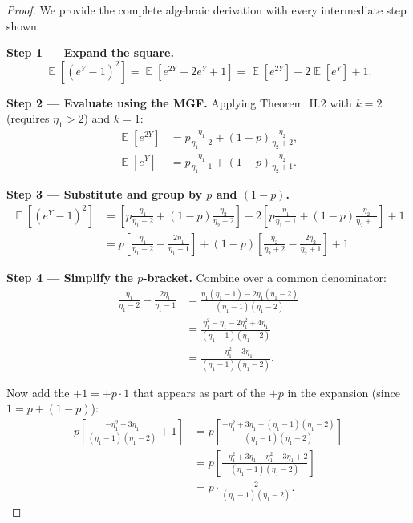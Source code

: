 \documentclass[11pt,a4paper,openany]{book}
\theoremstyle{definition}
\theoremstyle{plain}
\theoremstyle{remark}
\DeclareMathOperator{\E}{\mathbb{E}}
\newcommand{\1}{\mathbbm{1}}
\begin{document}
\begin{proof}
We provide the complete algebraic derivation with every intermediate step shown.

\textbf{Step 1 --- Expand the square.}
\[
\E[(e^{Y} - 1)^{2}] = \E[e^{2Y} - 2e^{Y} + 1] = \E[e^{2Y}] - 2\E[e^{Y}] + 1.
\]

\textbf{Step 2 --- Evaluate using the MGF.} Applying Theorem~H.2 with $k=2$ (requires $\eta_{1} > 2$) and $k=1$:
\[
\begin{aligned}
\E[e^{2Y}] &= p \frac{\eta_{1}}{\eta_{1} - 2} + (1-p) \frac{\eta_{2}}{\eta_{2} + 2}, \\
\E[e^{Y}] &= p \frac{\eta_{1}}{\eta_{1} - 1} + (1-p) \frac{\eta_{2}}{\eta_{2} + 1}.
\end{aligned}
\]

\textbf{Step 3 --- Substitute and group by $p$ and $(1-p)$.}
\[
\begin{aligned}
\E[(e^{Y} - 1)^{2}] &= \left[p \frac{\eta_{1}}{\eta_{1} - 2} + (1-p) \frac{\eta_{2}}{\eta_{2} + 2}\right] - 2\left[p \frac{\eta_{1}}{\eta_{1} - 1} + (1-p) \frac{\eta_{2}}{\eta_{2} + 1}\right] + 1 \\
&= p\left[ \frac{\eta_{1}}{\eta_{1} - 2} - \frac{2\eta_{1}}{\eta_{1} - 1} \right] + (1-p)\left[ \frac{\eta_{2}}{\eta_{2} + 2} - \frac{2\eta_{2}}{\eta_{2} + 1} \right] + 1.
\end{aligned}
\]

\textbf{Step 4 --- Simplify the $p$-bracket.} Combine over a common denominator:
\[
\begin{aligned}
\frac{\eta_{1}}{\eta_{1} - 2} - \frac{2\eta_{1}}{\eta_{1} - 1}
&= \frac{\eta_{1}(\eta_{1} - 1) - 2\eta_{1}(\eta_{1} - 2)}{(\eta_{1} - 1)(\eta_{1} - 2)} \\
&= \frac{\eta_{1}^{2} - \eta_{1} - 2\eta_{1}^{2} + 4\eta_{1}}{(\eta_{1} - 1)(\eta_{1} - 2)} \\
&= \frac{-\eta_{1}^{2} + 3\eta_{1}}{(\eta_{1} - 1)(\eta_{1} - 2)}.
\end{aligned}
\]

Now add the $+1 = +p \cdot 1$ that appears as part of the $+p$ in the expansion (since $1 = p + (1-p)$):
\[
\begin{aligned}
p\left[ \frac{-\eta_{1}^{2} + 3\eta_{1}}{(\eta_{1} - 1)(\eta_{1} - 2)} + 1 \right]
&= p\left[ \frac{-\eta_{1}^{2} + 3\eta_{1} + (\eta_{1} - 1)(\eta_{1} - 2)}{(\eta_{1} - 1)(\eta_{1} - 2)} \right] \\
&= p\left[ \frac{-\eta_{1}^{2} + 3\eta_{1} + \eta_{1}^{2} - 3\eta_{1} + 2}{(\eta_{1} - 1)(\eta_{1} - 2)} \right] \\
&= p \cdot \frac{2}{(\eta_{1} - 1)(\eta_{1} - 2)}.
\end{aligned}
\]


\end{proof}
\end{document}

